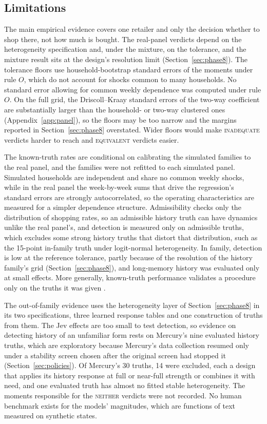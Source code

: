 \documentclass[11pt]{article}
\newcommand{\verdict}[1]{\textsc{#1}}
\begin{document}
\subsection{Limitations}
\label{sec:limitations}

The main empirical evidence covers one retailer and only the decision whether to shop there,
not how much is bought. The real-panel verdicts depend on the heterogeneity specification and, under the
mixture, on the tolerance, and the mixture result sits at the design's resolution limit
(Section~\ref{sec:phase8}). The tolerance floors use household-bootstrap standard errors of the moments under rule $O$,
which do not account for shocks common to many households. No standard error allowing for
common weekly dependence was computed under rule $O$. On the full grid, the Driscoll--Kraay
standard errors of the two-way coefficient are substantially larger than the household- or
two-way clustered ones (Appendix~\ref{app:panel}), so the floors may be too narrow and the
margins reported in Section~\ref{sec:phase8} overstated. Wider floors would make
\verdict{inadequate} verdicts harder to reach and \verdict{equivalent} verdicts easier.

The known-truth rates are conditional on calibrating the simulated families to the real panel,
and the families were not refitted to each simulated panel. Simulated households are independent
and share no common weekly shocks, while in the real panel the week-by-week sums that drive the
regression's standard errors are strongly autocorrelated, so the operating characteristics are
measured for a simpler dependence structure. Admissibility checks only the distribution of
shopping rates, so an admissible history truth can have dynamics unlike the real panel's, and
detection is measured only on admissible truths, which excludes some strong history truths that
distort that distribution, such as the 15-point in-family truth under logit-normal heterogeneity. In family, detection is low at the reference tolerance, partly because of the
resolution of the history family's grid (Section~\ref{sec:phase8}), and long-memory history was
evaluated only at small effects. More
generally, known-truth performance validates a procedure only on the truths it was given
\citep{advani2019}.

The out-of-family evidence uses the heterogeneity layer of Section~\ref{sec:phase8} in its two
specifications, three learned response tables and one construction of truths from them. The Jev
effects are too small to test detection, so evidence on detecting history of an unfamiliar form
rests on Mercury's nine evaluated history truths, which are exploratory because Mercury's data
collection resumed only under a stability screen chosen after the original screen had stopped
it (Section~\ref{sec:policies}). Of Mercury's 30 truths, 14 were excluded,
each a design that applies its history response at full or near-full strength or combines it with
need, and one evaluated truth has almost no fitted stable heterogeneity. The moments responsible for the \verdict{neither} verdicts were not recorded. No
human benchmark exists for the models' magnitudes, which are functions of text measured on
synthetic states.
\end{document}

